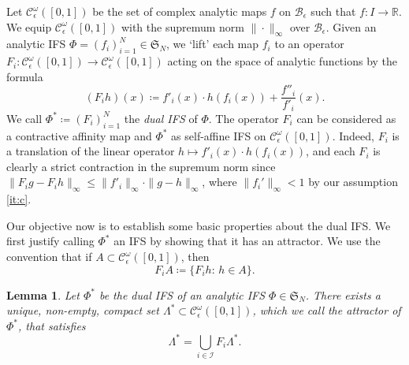 \documentclass[11pt,]{article}
\def\cref#1{\ref{#1}}%
\newtheorem{lemma}[theorem]{Lemma}
\theoremstyle{definition}
\theoremstyle{remark}
\newcommand{\0}{\mathbf{0}}
\numberwithin{equation}{section}
\begin{document}
Let $\mathcal{C}_\epsilon^\omega([0,1])$ be the set of complex analytic maps $f$ on
$\mathcal{B}_{\epsilon}$ such that $f\colon I \to \mathbb{R}$. We equip
$\mathcal{C}_\epsilon^\omega([0,1])$ with the supremum norm $\|\cdot\|_\infty$ over
$\mathcal{B}_\epsilon$. Given an analytic IFS $\Phi=(f_i)_{i=1}^N\in\mathfrak{S}_N$, we `lift' each
map $f_i$ to an operator $F_i:
\mathcal{C}^{\omega}_\epsilon([0,1]) \to \mathcal{C}_\epsilon^{\omega}([0,1])$ acting on the space of analytic
functions by the formula
\begin{equation}\label{eq:LiftedIFS}
	(F_i h)(x)\coloneqq f'_i(x)\cdot h(f_i(x)) + \frac{f''_i}{f'_i}(x).
\end{equation}
We call $\Phi^*\coloneqq(F_i)_{i=1}^N$ the \emph{dual IFS} of $\Phi$. The operator $F_i$ can be
considered as a contractive affinity map and $\Phi^*$ as self-affine IFS on
$\mathcal{C}_\epsilon^\omega([0,1])$.  Indeed, $F_i$ is a translation of the linear operator
$h\mapsto f'_i(x)\cdot h(f_i(x))$, and each $F_i$ is clearly a strict contraction in the supremum
norm since $\|F_ig-F_ih\|_{\infty}\leq \|f'_i\|_{\infty}\cdot\|g-h\|_{\infty}$, where
$\|f_i'\|_\infty<1$ by our assumption \cref{it:c}.

Our objective now is to establish some basic properties about the dual IFS. We first justify calling
$\Phi^*$ an IFS by showing that it has an attractor. We use the convention that if $A\subset
\mathcal{C}^{\omega}_\epsilon([0,1])$, then
\begin{equation*}
	F_iA \coloneqq \{F_i h:\, h\in A\}.
\end{equation*}
\begin{lemma}\label{lem:ExistanceAttractor}
	Let $\Phi^*$ be the dual IFS of an analytic IFS $\Phi\in\mathfrak{S}_N$. There exists a
	unique, non-empty, compact set $\Lambda^*\subset \mathcal{C}^{\omega}_\epsilon([0,1])$,
	which we call the \emph{attractor} of $\Phi^*$, that satisfies
	\begin{equation*}
		\Lambda^*=\bigcup_{i\in\mathcal{I}} F_i\Lambda^*.
	\end{equation*} 
\end{lemma} 
\end{document}
